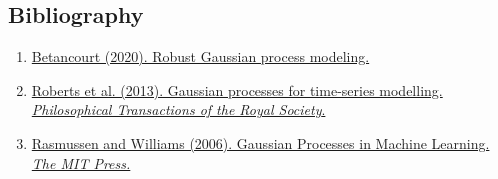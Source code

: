 \documentclass[a4paper, 10pt, fleqn]{article}
\begin{document}
\begin{flushleft}
   \section*{Bibliography}
      \begin{enumerate}
         \item \label{Betancourt2020} \href{https://betanalpha.github.io/assets/case_studies/gaussian_processes.html}{Betancourt (2020). Robust Gaussian process modeling.}
          \item \label{Roberts2013} \href{https://royalsocietypublishing.org/}{Roberts et al. (2013). Gaussian processes for time-series modelling. \textit{Philosophical Transactions of the Royal Society}.}
         \item \label{Rasmussen2006} \href{https://gaussianprocess.org/gpml/}{Rasmussen and Williams (2006). Gaussian Processes in Machine Learning. \textit{The MIT Press.}}
      \end{enumerate}
   
   \end{flushleft}
\end{document}
